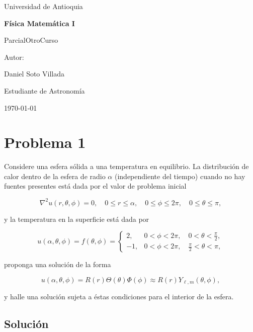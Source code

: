 \documentclass[a4paper]{article}
\begin{document}
\begin{titlepage}
  \centering
  {\Large Universidad de Antioquia\par}
  \vspace{2cm}
  {\huge\bfseries Física Matemática I\par}
  \vspace{0.4cm}
  {\Large ParcialOtroCurso \par}
  \vspace{2.5cm}
  {\large Autor:\par}
  \vspace{0.2cm}
  {\large Daniel Soto Villada\par}
  {\large Estudiante de Astronomía\par}
  \vfill
  {\large \today\par}
\end{titlepage}

\newpage
\tableofcontents
\newpage

\section{Problema 1}
Considere una esfera sólida a una temperatura en equilibrio. La distribución de calor dentro de la esfera de radio $\alpha$ (independiente del tiempo) cuando no hay fuentes presentes está dada por el valor de problema inicial

$$\nabla^2 u(r, \theta, \phi) = 0, \quad 0 \leq r \leq \alpha, \quad 0 \leq \phi \leq 2\pi, \quad 0 \leq \theta \leq \pi,$$

y la temperatura en la superficie está dada por

$$u(\alpha, \theta, \phi) = f(\theta, \phi) = \begin{cases} 2, & 0 < \phi < 2\pi, \quad 0 < \theta < \frac{\pi}{2}, \\ -1, & 0 < \phi < 2\pi, \quad \frac{\pi}{2} < \theta < \pi, \end{cases}$$

proponga una solución de la forma

$$u(\alpha, \theta, \phi) = R(r)\Theta(\theta)\Phi(\phi) \approx R(r)Y_{\ell, m}(\theta, \phi),$$

y halle una solución sujeta a éstas condiciones para el interior de la esfera.

\subsection{Solución}
\end{document}
